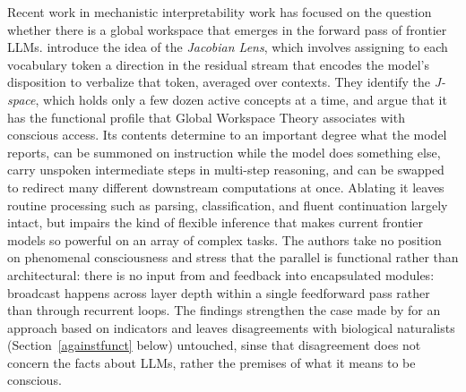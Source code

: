 Recent work in mechanistic interpretability work has focused on the question whether there is a global workspace that emerges in the forward pass of frontier LLMs. \citet{gurnee2026verbalize} introduce the idea of the \emph{Jacobian Lens}, which involves assigning to each vocabulary token a direction in the residual stream that encodes the model's disposition to verbalize that token, averaged over contexts. They identify the \emph{J-space}, which holds only a few dozen active concepts at a time, and argue that it has the functional profile that Global Workspace Theory associates with conscious access. Its contents determine to an important degree what the model reports, can be summoned on instruction while the model does something else, carry unspoken intermediate steps in multi-step reasoning, and can be swapped to redirect many different downstream computations at once. Ablating it leaves routine processing such as parsing, classification, and fluent continuation largely intact, but impairs the kind of flexible inference that makes current frontier models so powerful on an array of complex tasks. The authors take no position on phenomenal consciousness and stress that the parallel is functional rather than architectural: there is no input from and feedback into encapsulated modules: broadcast happens across layer depth within a single feedforward pass rather than through recurrent loops. The findings strengthen the case made by \citet{butlin2023consciousness} for an approach based on indicators and leaves disagreements with biological naturalists (Section~\ref{againstfunct} below) untouched, sinse that disagreement does not concern the facts about LLMs, rather the premises of what it means to be conscious. 

